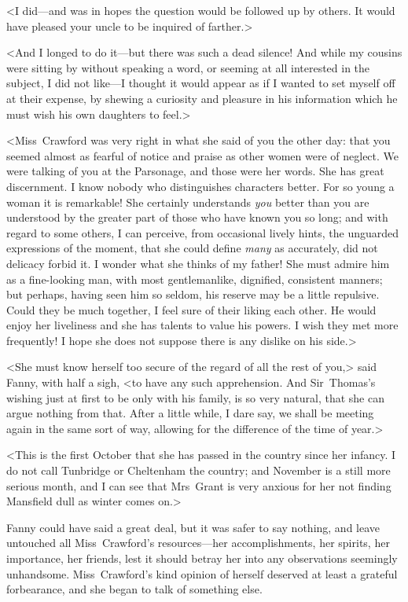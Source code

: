 <I did—and was in hopes the question would be followed up by others. It would have pleased your uncle to be inquired of farther.>

<And I longed to do it—but there was such a dead silence! And while my cousins were sitting by without speaking a word, or seeming at all interested in the subject, I did not like—I thought it would appear as if I wanted to set myself off at their expense, by shewing a curiosity and pleasure in his information which he must wish his own daughters to feel.>

<Miss~Crawford was very right in what she said of you the other day: that you seemed almost as fearful of notice and praise as other women were of neglect. We were talking of you at the Parsonage, and those were her words. She has great discernment. I know nobody who distinguishes characters better. For so young a woman it is remarkable! She certainly understands \textit{you}  better than you are understood by the greater part of those who have known you so long; and with regard to some others, I can perceive, from occasional lively hints, the unguarded expressions of the moment, that she could define \textit{many}  as accurately, did not delicacy forbid it. I wonder what she thinks of my father! She must admire him as a fine-looking man, with most gentlemanlike, dignified, consistent manners; but perhaps, having seen him so seldom, his reserve may be a little repulsive. Could they be much together, I feel sure of their liking each other. He would enjoy her liveliness and she has talents to value his powers. I wish they met more frequently! I hope she does not suppose there is any dislike on his side.>

<She must know herself too secure of the regard of all the rest of you,> said Fanny, with half a sigh, <to have any such apprehension. And Sir~Thomas's wishing just at first to be only with his family, is so very natural, that she can argue nothing from that. After a little while, I dare say, we shall be meeting again in the same sort of way, allowing for the difference of the time of year.>

<This is the first October that she has passed in the country since her infancy. I do not call Tunbridge or Cheltenham the country; and November is a still more serious month, and I can see that Mrs~Grant is very anxious for her not finding Mansfield dull as winter comes on.>

Fanny could have said a great deal, but it was safer to say nothing, and leave untouched all Miss~Crawford's resources—her accomplishments, her spirits, her importance, her friends, lest it should betray her into any observations seemingly unhandsome. Miss~Crawford's kind opinion of herself deserved at least a grateful forbearance, and she began to talk of something else.

